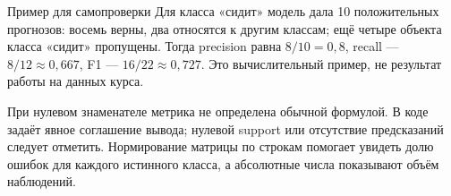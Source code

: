 \begin{keybox}{Пример для самопроверки}
Для класса «сидит» модель дала 10 положительных прогнозов: восемь верны, два относятся к другим классам; ещё четыре объекта класса «сидит» пропущены. Тогда precision равна \(8/10=0{,}8\), recall --- \(8/12\approx0{,}667\), F1 --- \(16/22\approx0{,}727\). Это вычислительный пример, не результат работы на данных курса.
\end{keybox}

При нулевом знаменателе метрика не определена обычной формулой. В коде  задаёт явное соглашение вывода; нулевой support или отсутствие предсказаний следует отметить. Нормирование матрицы по строкам помогает увидеть долю ошибок для каждого истинного класса, а абсолютные числа показывают объём наблюдений.
